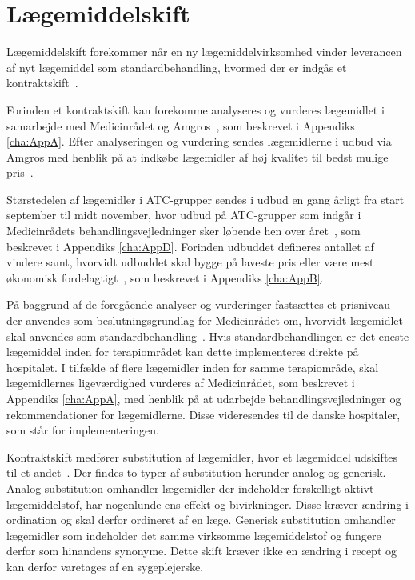 \section{Lægemiddelskift}
Lægemiddelskift forekommer når en ny lægemiddelvirksomhed vinder leverancen af nyt lægemiddel som standardbehandling, hvormed der er indgås et kontraktskift~\citep{Amgros2015}. 

Forinden et kontraktskift kan forekomme analyseres og vurderes lægemidlet i samarbejde med Medicinrådet og Amgros~\citep{DanskeRegioner2016}, som beskrevet i Appendiks \ref{cha:AppA}. Efter analyseringen og vurdering sendes lægemidlerne i udbud via Amgros med henblik på at indkøbe lægemidler af høj kvalitet til bedst mulige pris~\citep{Sygehusapoteket2017}.

Størstedelen af lægemidler i ATC-grupper sendes i udbud en gang årligt fra start september til midt november, hvor udbud på ATC-grupper som indgår i Medicinrådets behandlingsvejledninger sker løbende hen over året~\citep{Sygehusapoteket2017}, som beskrevet i Appendiks \ref{cha:AppD}.
Forinden udbuddet defineres antallet af vindere samt, hvorvidt udbuddet skal bygge på laveste pris eller være mest økonomisk fordelagtigt~\citep{Amgros2018a}, som beskrevet i Appendiks \ref{cha:AppB}.

På baggrund af de foregående analyser og vurderinger fastsættes et prisniveau der anvendes som beslutningsgrundlag for Medicinrådet om, hvorvidt lægemidlet skal anvendes som standardbehandling~\citep{DanskeRegioner2016}. Hvis standardbehandlingen er det eneste lægemiddel inden for terapiområdet kan dette implementeres direkte på hospitalet. I tilfælde af flere lægemidler inden for samme terapiområde, skal lægemidlernes ligeværdighed vurderes af Medicinrådet, som beskrevet i Appendiks \ref{cha:AppA}, med henblik på at udarbejde behandlingsvejledninger og rekommendationer for lægemidlerne. Disse videresendes til de danske hospitaler, som står for implementeringen.~\citep{DanskeRegioner2016}

Kontraktskift medfører substitution af lægemidler, hvor et lægemiddel udskiftes til et andet~\citep{DanskSelskabforPatientsikkerhed2009}. Der findes to typer af substitution herunder analog og generisk.
Analog substitution omhandler lægemidler der indeholder forskelligt aktivt lægemiddelstof, har nogenlunde ens effekt og bivirkninger. Disse kræver ændring i ordination og skal derfor ordineret af en læge. Generisk substitution omhandler lægemidler som indeholder det samme virksomme lægemiddelstof og fungere derfor som hinandens synonyme. Dette skift kræver ikke en ændring i recept og kan derfor varetages af en sygeplejerske.~\citep{DanskSelskabforPatientsikkerhed2009}

